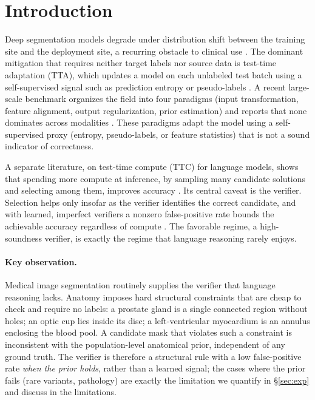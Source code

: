 \documentclass[10pt,twocolumn]{article}
\begin{document}
\section{Introduction}
Deep segmentation models degrade under distribution shift between the training site and the deployment site, a recurring obstacle to clinical use \citep{yu2025medsegtta}. The dominant mitigation that requires neither target labels nor source data is test-time adaptation (TTA), which updates a model on each unlabeled test batch using a self-supervised signal such as prediction entropy or pseudo-labels \citep{wang2021tent,wang2022cotta}. A recent large-scale benchmark organizes the field into four paradigms (input transformation, feature alignment, output regularization, prior estimation) and reports that none dominates across modalities \citep{yu2025medsegtta}. These paradigms adapt the model using a self-supervised proxy (entropy, pseudo-labels, or feature statistics) that is not a sound indicator of correctness.

A separate literature, on test-time compute (TTC) for language models, shows that spending more compute at inference, by sampling many candidate solutions and selecting among them, improves accuracy \citep{snell2024scaling,brown2024monkeys}. Its central caveat is the verifier. Selection helps only insofar as the verifier identifies the correct candidate, and with learned, imperfect verifiers a nonzero false-positive rate bounds the achievable accuracy regardless of compute \citep{stroebl2024verifier,setlur2025verifier}. The favorable regime, a high-soundness verifier, is exactly the regime that language reasoning rarely enjoys.

\paragraph{Key observation.} Medical image segmentation routinely supplies the verifier that language reasoning lacks. Anatomy imposes hard structural constraints that are cheap to check and require no labels: a prostate gland is a single connected region without holes; an optic cup lies inside its disc; a left-ventricular myocardium is an annulus enclosing the blood pool. A candidate mask that violates such a constraint is inconsistent with the population-level anatomical prior, independent of any ground truth. The verifier is therefore a structural rule with a low false-positive rate \emph{when the prior holds}, rather than a learned signal; the cases where the prior fails (rare variants, pathology) are exactly the limitation we quantify in \S\ref{sec:exp} and discuss in the limitations.
\end{document}
